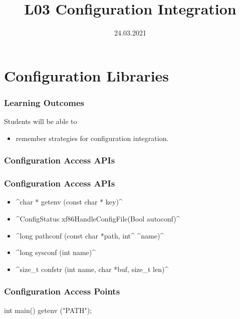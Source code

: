 


\title{L03 Configuration Integration}
\date{24.03.2021}



\section{Configuration Libraries}


\begin{frame}
	\frametitle{Learning Outcomes}
	Students will be able to
	\begin{itemize}
	\item remember strategies for configuration integration.
	\end{itemize}
\end{frame}

\begin{frame}
	\frametitle{Configuration Access APIs}

	\Large

\end{frame}

\begin{frame}[fragile]
	\frametitle{Configuration Access APIs}

	\begin{itemize}[<+-| alert@+>]
	\item ^char * getenv (const char * key)^
	\item ^ConfigStatus xf86HandleConfigFile(Bool autoconf)^
	\item ^long pathconf (const char *path, int^ ^name)^
	\item ^long sysconf (int name)^
	\item ^size_t confstr (int name, char *buf, size_t len)^
	\end{itemize}
\end{frame}

\begin{frame}[fragile]
	\frametitle{Configuration Access Points}

	\begin{code}[language=Cpp,gobble=4,showspaces=no]
	int main()
	{
		getenv ("PATH");
	}
	\end{code}
\end{frame}

